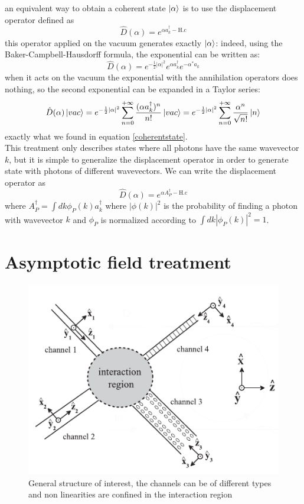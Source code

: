 \documentclass[12pt]{book}
\begin{document}
an equivalent way to obtain a coherent state $\ket{\alpha}$ is to use the displacement operator defined as 
\begin{equation}\label{def:displacement}\hat{D}(\alpha) = e^{\alpha a_k^\dagger -\text{H.c}}\end{equation}
this operator applied on the vacuum generates exactly $\ket{\alpha}$: indeed, using the Baker-Campbell-Hausdorff formula, the exponential can be written as:
\begin{equation}\hat{D}(\alpha) = e^{-\frac{1}{2}|\alpha|^2}e^{\alpha a_k^\dagger} e^{-\alpha^* a_k}\end{equation}
when it acts on the vacuum the exponential with the annihilation operators does nothing, so the second exponential can be expanded in a Taylor series:
\begin{equation}\hat{D}(\alpha)\ket{vac} = e^{-\frac{1}{2}|\alpha|^2}\sum_{n=0}^{+\infty}\frac{(\alpha a_k^\dagger)^n}{n!}\ket{vac} = e^{-\frac{1}{2}|\alpha|^2}\sum_{n=0}^{+\infty} \frac{\alpha^n}{\sqrt{n!}}\ket{n}  \end{equation}
exactly what we found in equation \eqref{coherentstate}.\\
This treatment only describes states where all photons have the same wavevector $k$, but it is simple to generalize the displacement operator in order to generate state with photons of different wavevectors. We can write the displacement operator as
\begin{equation}\hat{D}(\alpha) = e^{\alpha A^\dagger_P -\text{H.c}}\end{equation}
where $A^\dagger_P = \int dk \phi_P(k) a_k^\dagger$ where $|\phi(k)|^2$ is the probability of finding a photon with wavevector $k$ and $\phi_P$ is normalized according to $\int dk |\phi_P(k)|^2 = 1$.


\section{Asymptotic field treatment}\label{section:asymptotic}
\begin{figure}
\centering
\includegraphics[width = .7\textwidth]{img/asymptotic}
\caption{General structure of interest, the channels can be of different types and non linearities are confined in the interaction region}
\label{generalstructure}
\end{figure}
\end{document}
